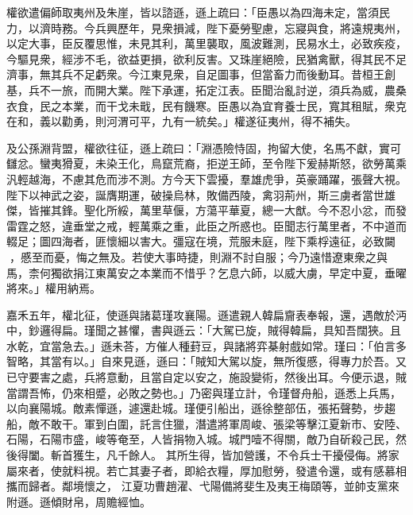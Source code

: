 \begin{pinyinscope}
 
 
 
 權欲遣偏師取夷州及朱崖，皆以諮遜，遜上疏曰：「臣愚以為四海未定，當須民力，以濟時務。今兵興歷年，見衆損減，陛下憂勞聖慮，忘寢與食，將遠規夷州，以定大事，臣反覆思惟，未見其利，萬里襲取，風波難測，民易水土，必致疾疫，今驅見衆，經涉不毛，欲益更損，欲利反害。又珠崖絕險，民猶禽獸，得其民不足濟事，無其兵不足虧衆。今江東見衆，自足圖事，但當畜力而後動耳。昔桓王創基，兵不一旅，而開大業。陛下承運，拓定江表。臣聞治亂討逆，須兵為威，農桑衣食，民之本業，而干戈未戢，民有饑寒。臣愚以為宜育養士民，寬其租賦，衆克在和，義以勸勇，則河渭可平，九有一統矣。」權遂征夷州，得不補失。
 
 
 
 
 及公孫淵背盟，權欲往征，遜上疏曰：「淵憑險恃固，拘留大使，名馬不獻，實可讎忿。蠻夷猾夏，未染王化，鳥竄荒裔，拒逆王師，至令陛下爰赫斯怒，欲勞萬乘汎輕越海，不慮其危而涉不測。方今天下雲擾，羣雄虎爭，英豪踊躍，張聲大視。陛下以神武之姿，誕膺期運，破操烏林，敗備西陵，禽羽荊州，斯三虜者當世雄傑，皆摧其鋒。聖化所綏，萬里草偃，方蕩平華夏，總一大猷。今不忍小忿，而發雷霆之怒，違垂堂之戒，輕萬乘之重，此臣之所惑也。臣聞志行萬里者，不中道而輟足；圖四海者，匪懷細以害大。彊寇在境，荒服未庭，陛下乘桴遠征，必致闚𨵦，慼至而憂，悔之無及。若使大事時捷，則淵不討自服；今乃遠惜遼東衆之與馬，柰何獨欲捐江東萬安之本業而不惜乎？乞息六師，以威大虜，早定中夏，垂曜將來。」權用納焉。
 
 
嘉禾五年，權北征，使遜與諸葛瑾攻襄陽。遜遣親人韓扁齎表奉報，還，遇敵於沔中，鈔邏得扁。瑾聞之甚懼，書與遜云：「大駕已旋，賊得韓扁，具知吾闊狹。且水乾，宜當急去。」遜未荅，方催人種葑豆，與諸將弈棊射戲如常。瑾曰：「伯言多智略，其當有以。」自來見遜，遜曰：「賊知大駕以旋，無所復慼，得專力於吾。又已守要害之處，兵將意動，且當自定以安之，施設變術，然後出耳。今便示退，賊當謂吾怖，仍來相蹙，必敗之勢也。」乃密與瑾立計，令瑾督舟船，遜悉上兵馬，以向襄陽城。敵素憚遜，遽還赴城。瑾便引船出，遜徐整部伍，張拓聲勢，步趨船，敵不敢干。軍到白圍，託言住獵，潛遣將軍周峻、張梁等擊江夏新市、安陸、石陽，石陽市盛，峻等奄至，人皆捐物入城。城門噎不得關，敵乃自斫殺己民，然後得闔。斬首獲生，凡千餘人。
 其所生得，皆加營護，不令兵士干擾侵侮。將家屬來者，使就料視。若亡其妻子者，即給衣糧，厚加慰勞，發遣令還，或有感慕相攜而歸者。鄰境懷之，
 江夏功曹趙濯、弋陽備將斐生及夷王梅頤等，並帥支黨來附遜。遜傾財帛，周贍經恤。
 

\end{pinyinscope}
